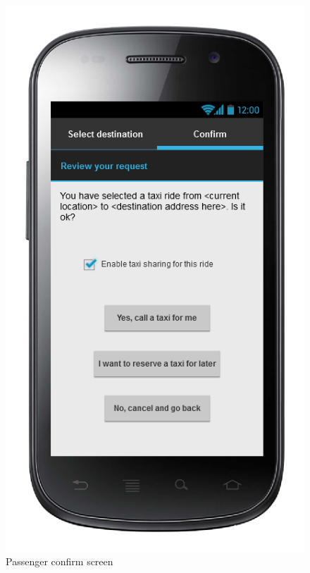 \begin{center}
\begin{figure} [h]
  	  \includegraphics[scale=0.5]{ui/Passenger confirm screen.png}
\caption{Passenger confirm screen}
  
	\end{figure}
\end{center}

